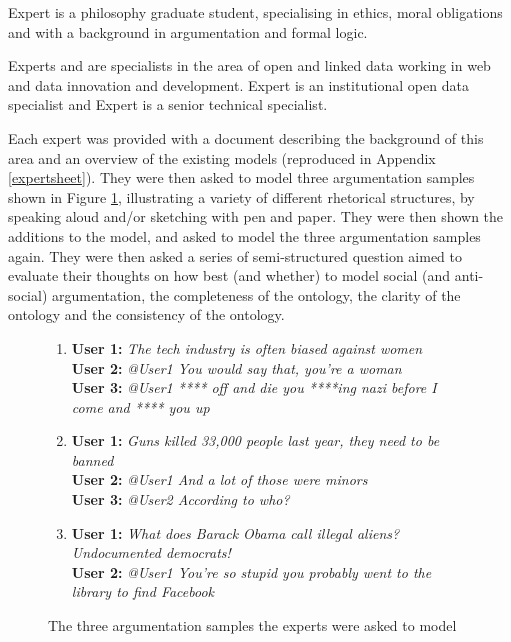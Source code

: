 Expert \lizzy is a philosophy graduate student, specialising in ethics, moral obligations and with a background in argumentation and formal logic.

Experts \ash and \chris are specialists in the area of open and linked data  working in web and data innovation and development. Expert \ash is an institutional open data specialist and Expert \chris is a senior technical specialist.

Each expert was provided with a document describing the background of this area and an overview of the existing models (reproduced in Appendix \ref{expertsheet}). They were then asked to model three argumentation samples shown in Figure \ref{figure:snippets}, illustrating a variety of different rhetorical structures, by speaking aloud and/or sketching with pen and paper. They were then shown the additions to the model, and asked to model the three argumentation samples again. They were then asked a series of semi-structured question aimed to evaluate their thoughts on how best (and whether) to model social (and anti-social) argumentation, the completeness of the ontology, the clarity of the ontology and the consistency of the ontology.


\begin{figure}

\begin{enumerate}
\small
\item 
\textbf{User 1:} \textit{The tech industry is often biased against women}\\
\textbf{User 2:} \textit{@User1 You would say that, you're a woman}\\
\textbf{User 3:} \textit{@User1 **** off and die you ****ing nazi before I come and **** you up}
~\newline
\item 
\textbf{User 1:} \textit{Guns killed 33,000 people last year, they need to be banned}\\
\textbf{User 2:} \textit{@User1 And a lot of those were minors}\\
\textbf{User 3:} \textit{@User2 According to who?}
~\newline
\item 
\textbf{User 1:} \textit{What does Barack Obama call illegal aliens? Undocumented democrats!}\\
\textbf{User 2:} \textit{@User1 You're so stupid you probably went to the library to find Facebook}


\end{enumerate}
\caption{The three argumentation samples the experts were asked to model}
\label{figure:snippets}
\end{figure}


